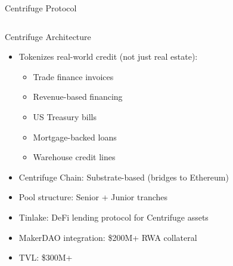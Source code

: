 \documentclass[8pt,aspectratio=169]{beamer}
\begin{document}
\begin{frame}{Centrifuge Protocol}
\begin{columns}[T]
\vspace{2mm}
\footnotesize
\begin{block}{Centrifuge Architecture}
\begin{itemize}
  \item Tokenizes real-world credit (not just real estate):
    \begin{itemize}\tiny
      \item Trade finance invoices
      \item Revenue-based financing
      \item US Treasury bills
      \item Mortgage-backed loans
      \item Warehouse credit lines
    \end{itemize}
  \item Centrifuge Chain: Substrate-based (bridges to Ethereum)
  \item Pool structure: Senior + Junior tranches
  \item Tinlake: DeFi lending protocol for Centrifuge assets
  \item MakerDAO integration: \$200M+ RWA collateral
  \item TVL: \$300M+
\end{itemize}
\end{block}


\end{columns}
\end{frame}
\end{document}
